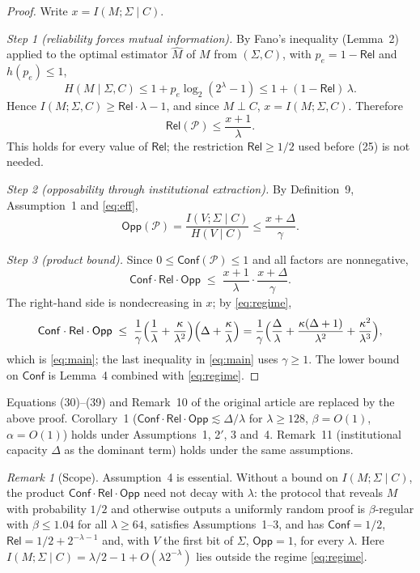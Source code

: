 \documentclass[10pt,a4paper]{article}
\theoremstyle{remark}
\newtheorem*{remark}{Remark}
\newcommand{\Conf}{\mathsf{Conf}}
\newcommand{\Rel}{\mathsf{Rel}}
\newcommand{\Opp}{\mathsf{Opp}}
\newcommand{\cP}{\mathcal{P}}
\newcommand{\IMS}{I(M;\Sigma\mid C)}
\begin{document}
\begin{proof}
Write $x=\IMS$.

\emph{Step 1 (reliability forces mutual information).}
By Fano's inequality (Lemma~2) applied to the optimal estimator
$\hat M$ of $M$ from $(\Sigma,C)$, with $p_e=1-\Rel$ and $h(p_e)\le1$,
\[
H(M\mid\Sigma,C)\le 1+p_e\log_2(2^\lambda-1)\le 1+(1-\Rel)\,\lambda .
\]
Hence $I(M;\Sigma,C)\ge\Rel\cdot\lambda-1$, and since $M\perp C$,
$x=I(M;\Sigma,C)$. Therefore
\begin{equation*}\tag{26$'$}
\Rel(\cP)\le\frac{x+1}{\lambda}.
\end{equation*}
This holds for every value of $\Rel$; the restriction $\Rel\ge 1/2$
used before (25) is not needed.

\emph{Step 2 (opposability through institutional extraction).}
By Definition~9, Assumption~1 and \eqref{eq:eff},
\begin{equation*}\tag{29$'$}
\Opp(\cP)=\frac{I(V;\Sigma\mid C)}{H(V\mid C)}\le\frac{x+\Delta}{\gamma}.
\end{equation*}

\emph{Step 3 (product bound).}
Since $0\le\Conf(\cP)\le 1$ and all factors are nonnegative,
\[
\Conf\cdot\Rel\cdot\Opp\;\le\;\frac{x+1}{\lambda}\cdot\frac{x+\Delta}{\gamma}.
\]
The right-hand side is nondecreasing in $x$; by \eqref{eq:regime},
\[
\Conf\cdot\Rel\cdot\Opp\;\le\;\frac1\gamma
\Bigl(\frac1\lambda+\frac{\kappa}{\lambda^{2}}\Bigr)
\Bigl(\Delta+\frac{\kappa}{\lambda}\Bigr)
=\frac1\gamma\Bigl(\frac{\Delta}{\lambda}+\frac{\kappa(\Delta+1)}{\lambda^{2}}
+\frac{\kappa^{2}}{\lambda^{3}}\Bigr),
\]
which is \eqref{eq:main}; the last inequality in \eqref{eq:main} uses
$\gamma\ge1$. The lower bound on $\Conf$ is Lemma~4 combined with
\eqref{eq:regime}.
\end{proof}

\noindent Equations (30)--(39) and Remark~10 of the original article are
replaced by the above proof. Corollary~1 ($\Conf\cdot\Rel\cdot\Opp\lesssim
\Delta/\lambda$ for $\lambda\ge128$, $\beta=O(1)$, $\alpha=O(1)$) holds
under Assumptions~1, 2$'$, 3 and~4. Remark~11 (institutional capacity $\Delta$ as the
dominant term) holds under the same assumptions.

\begin{remark}[Scope]
Assumption~4 is essential. Without a bound on $\IMS$, the product
$\Conf\cdot\Rel\cdot\Opp$ need not decay with $\lambda$: the protocol that
reveals $M$ with probability $1/2$ and otherwise outputs a uniformly random
proof is $\beta$-regular with $\beta\le 1.04$ for all $\lambda\ge 64$, satisfies
Assumptions~1--3, and has $\Conf=1/2$, $\Rel=1/2+2^{-\lambda-1}$ and, with
$V$ the first bit of $\Sigma$, $\Opp=1$, for every $\lambda$. Here
$\IMS=\lambda/2-1+O(\lambda 2^{-\lambda})$ lies outside the regime
\eqref{eq:regime}.
\end{remark}
\end{document}
